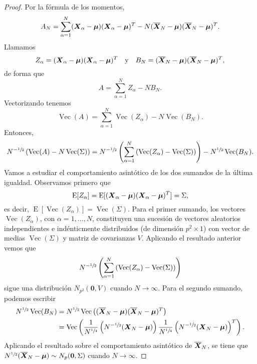 \begin{proof}
  Por la fórmula de los momentos, \[
    A_N = \sum_{\alpha = 1}^N(\boldsymbol{X}_{\alpha} - \boldsymbol \mu)(\boldsymbol{X}_{\alpha} - \boldsymbol \mu)^T - N(\overline{\boldsymbol{X}}_N - \boldsymbol \mu)(\overline{\boldsymbol{X}}_N - \boldsymbol \mu)^T.
  \]
  Llamamos \[
    Z_{\alpha} = (\boldsymbol{X}_{\alpha} - \boldsymbol \mu)(\boldsymbol{X}_{\alpha} - \boldsymbol \mu)^T
    \quad
    \text{y}
    \quad
    B_N = (\overline{\boldsymbol{X}}_N - \boldsymbol \mu)(\overline{\boldsymbol{X}}_N - \boldsymbol \mu)^T,
  \] de forma que \[
    A = \sum_{\alpha = 1}^NZ_{\alpha} - NB_N.
  \]
  Vectorizando tenemos \[
    \operatorname{Vec}(A) = \sum_{\alpha = 1}^N \operatorname{Vec}(Z_{\alpha}) - N\operatorname{Vec}(B_N).
  \]
  Entonces, \[
    N^{-\sfrac{1}{2}}\left(\operatorname{Vec}(A) - N\operatorname{Vec}(\Sigma)\right)
    = N^{-\sfrac{1}{2}}\left(\sum_{\alpha = 1}^N\left(\operatorname{Vec}(Z_{\alpha}) - \operatorname{Vec}(\Sigma)\right)\right) - N^{\sfrac{1}{2}} \operatorname{Vec}(B_N).
  \]
  Vamos a estudiar el comportamiento asintótico de los dos sumandos de la última igualdad. 
  Observamos primero que \[
    \operatorname{E}[Z_{\alpha}] = \operatorname{E}[(\boldsymbol{X}_{\alpha} - \boldsymbol \mu)(\boldsymbol{X}_{\alpha} - \boldsymbol \mu)^T] = \Sigma,
  \] es decir, \(\operatorname{E}[\operatorname{Vec}(Z_{\alpha})] = \operatorname{Vec}(\Sigma)\).
  Para el primer sumando, los vectores \(\operatorname{Vec}(Z_{\alpha})\), con \(\alpha = 1, \dots, N\), constituyen una sucesión de vectores aleatorios independientes e indénticmente distribuidos (de dimensión \(p^2 \times 1\)) con vector de medias \(\operatorname{Vec}(\Sigma)\) y matriz de covarianzas \(V\).
  Aplicando el resultado anterior vemos que \[
    N^{-\sfrac{1}{2}}\left(\sum_{\alpha = 1}^N\left(\operatorname{Vec}(Z_{\alpha}) - \operatorname{Vec}(\Sigma)\right)\right)
  \] sigue una distribución \(N_{p^2}(\boldsymbol 0, V)\) cuando \(N \to \infty\).
  Para el segundo sumando, podemos escribir \begin{align*}
    N^{\sfrac{1}{2}} \operatorname{Vec}(B_N) 
    &= N^{\sfrac{1}{2}} \operatorname{Vec}\left((\overline{\boldsymbol{X}}_N - \boldsymbol \mu)(\overline{\boldsymbol{X}}_N - \boldsymbol \mu)^T\right)\\
    &= \operatorname{Vec}\left(\frac{1}{N^{\sfrac{1}{4}}}\left(N^{-\sfrac{1}{2}}(\boldsymbol{X}_N - \boldsymbol \mu)\right) \frac{1}{N^{\sfrac{1}{4}}}\left(N^{-\sfrac{1}{2}}(\boldsymbol{X}_N - \boldsymbol \mu)\right)^T\right).
  \end{align*}
  Aplicando el resultado sobre el comportamiento asintótico de \(\overline{\boldsymbol{X}}_N\), se tiene que \(N^{\sfrac{1}{2}}(\overline{\boldsymbol{X}}_N - \boldsymbol \mu) \sim N_p(\boldsymbol 0, \Sigma)\) cuando \(N \to \infty\).

\end{proof}
